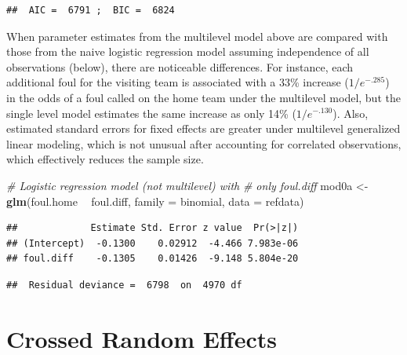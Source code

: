 \documentclass[
]{krantz}
\newenvironment{Shaded}{\begin{snugshade}}{\end{snugshade}}
\newcommand{\CommentTok}[1]{\textcolor[rgb]{0.37,0.37,0.37}{\textit{#1}}}
\newcommand{\DataTypeTok}[1]{\textcolor[rgb]{0.27,0.27,0.27}{#1}}
\newcommand{\KeywordTok}[1]{\textcolor[rgb]{0.27,0.27,0.27}{\textbf{#1}}}
\newcommand{\NormalTok}[1]{#1}
\newcommand{\OperatorTok}[1]{\textcolor[rgb]{0.43,0.43,0.43}{\textbf{#1}}}
\newcommand{\StringTok}[1]{\textcolor[rgb]{0.5,0.5,0.5}{#1}}
\begin{document}
\begin{verbatim}
##  AIC =  6791 ;  BIC =  6824
\end{verbatim}

When parameter estimates from the multilevel model above are compared with those from the naive logistic regression model assuming independence of all observations (below), there are noticeable differences. For instance, each additional foul for the visiting team is associated with a 33\% increase (\(1/e^{-.285}\)) in the odds of a foul called on the home team under the multilevel model, but the single level model estimates the same increase as only 14\% (\(1/e^{-.130}\)). Also, estimated standard errors for fixed effects are greater under multilevel generalized linear modeling, which is not unusual after accounting for correlated observations, which effectively reduces the sample size.

\begin{Shaded}
\begin{Highlighting}[]
\CommentTok{# Logistic regression model (not multilevel) with }
\CommentTok{#   only foul.diff}
\NormalTok{mod0a <-}\StringTok{ }\KeywordTok{glm}\NormalTok{(foul.home }\OperatorTok{~}\StringTok{ }\NormalTok{foul.diff, }\DataTypeTok{family =}\NormalTok{ binomial, }
             \DataTypeTok{data =}\NormalTok{ refdata)}
\end{Highlighting}
\end{Shaded}

\begin{verbatim}
##             Estimate Std. Error z value  Pr(>|z|)
## (Intercept)  -0.1300    0.02912  -4.466 7.983e-06
## foul.diff    -0.1305    0.01426  -9.148 5.804e-20
\end{verbatim}

\begin{verbatim}
##  Residual deviance =  6798  on  4970 df
\end{verbatim}

\hypertarget{crossedre}{%
\section{Crossed Random Effects}\label{crossedre}}
\end{document}
